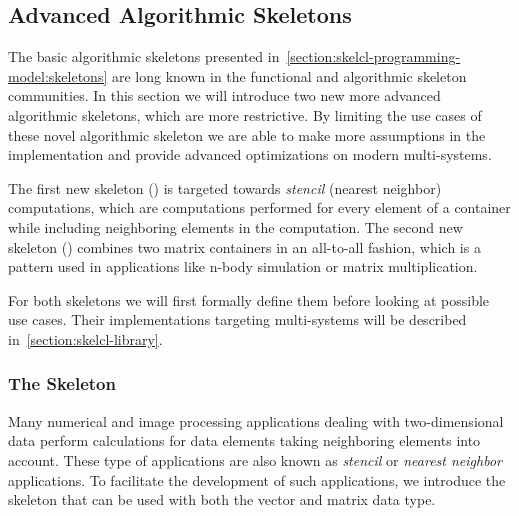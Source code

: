 \subsection{Advanced Algorithmic Skeletons}
\label{section:skelcl-programming-model:specialSkeletons}

The basic algorithmic skeletons presented in~\autoref{section:skelcl-programming-model:skeletons} are long known in the functional and algorithmic skeleton communities.
In this section we will introduce two new more advanced algorithmic skeletons, which are more restrictive.
By limiting the use cases of these novel algorithmic skeleton we are able to make more assumptions in the implementation and provide advanced optimizations on modern multi-\GPU systems.

The first new skeleton (\stencil) is targeted towards \emph{stencil} (\aka nearest neighbor) computations, which are computations performed for every element of a container while including neighboring elements in the computation.
The second new skeleton (\allpairs) combines two matrix containers in an all-to-all fashion, which is a pattern used in applications like n-body simulation or matrix multiplication.

For both skeletons we will first formally define them before looking at possible use cases.
Their implementations targeting multi-\GPU systems will be described in~\autoref{section:skelcl-library}.


\subsubsection{The \stencil Skeleton}

Many numerical and image processing applications dealing with two-dimensional data perform calculations for data elements taking neighboring elements into account.
These type of applications are also known as \emph{stencil} or \emph{nearest neighbor} applications.
To facilitate the development of such applications, we introduce the \stencil skeleton that can be used with both the vector and matrix data type.


